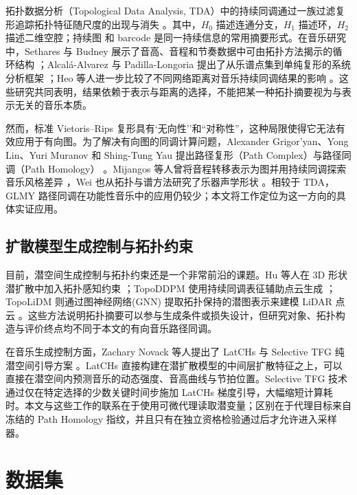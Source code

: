 \documentclass{article}
\begin{document}
拓扑数据分析（Topological Data Analysis, TDA）中的持续同调通过一族过滤复形追踪拓扑特征随尺度的出现与消失 \cite{Edelsbrunner2002}。其中，$H_0$ 描述连通分支，$H_1$ 描述环，$H_2$ 描述二维空腔；持续图 \cite{David2007} 和 barcode \cite{Carlsson2004} 是同一持续信息的常用摘要形式。在音乐研究中，Sethares 与 Budney 展示了音高、音程和节奏数据中可由拓扑方法揭示的循环结构 \cite{Sethares_2014}；Alcalá-Alvarez 与 Padilla-Longoria 提出了从乐谱点集到单纯复形的系统分析框架 \cite{Alberto2024}；Heo 等人进一步比较了不同网络距离对音乐持续同调结果的影响 \cite{Heo_2025}。这些研究共同表明，结果依赖于表示与距离的选择，不能把某一种拓扑摘要视为与表示无关的音乐本质。

然而，标准 Vietoris--Rips 复形具有`无向性''和``对称性''，这种局限使得它无法有效应用于有向图。为了解决有向图的同调计算问题，Alexander Grigor'yan、Yong Lin、Yuri Muranov 和 Shing-Tung Yau 提出路径复形（Path Complex）与路径同调（Path Homology） \cite{glmy2013, glmy2020}。Mijangos 等人曾将音程转移表示为图并用持续同调探索音乐风格差异 \cite{Martin2022}，Wei 也从拓扑与谱方法研究了乐器声学形状 \cite{Wei2024}。相较于 TDA，GLMY 路径同调在功能性音乐中的应用仍较少；本文将工作定位为这一方向的具体实证应用。

\subsection{扩散模型生成控制与拓扑约束}

目前，潜空间生成控制与拓扑约束还是一个非常前沿的课题。Hu 等人在 3D 形状潜扩散中加入拓扑感知约束 \cite{hu2024topologyawarelatentdiffusion3d}；TopoDDPM 使用持续同调表征辅助点云生成 \cite{DU2026109240}；TopoLiDM 则通过图神经网络(GNN) 提取拓扑保持的潜图表示来建模 LiDAR 点云 \cite{liu2025topolidmtopologyawarelidardiffusion}。这些方法说明拓扑摘要可以参与生成条件或损失设计，但研究对象、拓扑构造与评价终点均不同于本文的有向音乐路径同调。

在音乐生成控制方面，Zachary Novack 等人提出了 LatCHs 与 Selective TFG 纯潜空间引导方案 \cite{novack2026}。LatCHs 直接构建在潜扩散模型的中间层扩散特征之上，可以直接在潜空间内预测音乐的动态强度、音高曲线与节拍位置。Selective TFG 技术通过仅在特定选择的少数关键时间步施加 LatCHs 梯度引导，大幅缩短计算耗时。本文与这些工作的联系在于使用可微代理读取潜变量；区别在于代理目标来自冻结的 Path Homology 指纹，并且只有在独立资格检验通过后才允许进入采样器。

\section{数据集}
\end{document}
